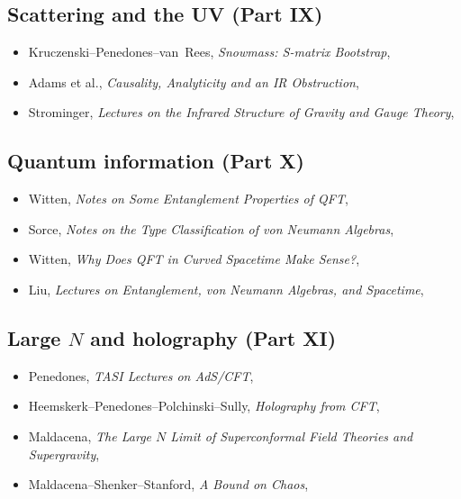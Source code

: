\subsection*{Scattering and the UV (Part IX)}
\begin{itemize}
\item[$\bullet$] Kruczenski--Penedones--van~Rees, \emph{Snowmass: S-matrix Bootstrap}, 
\item[$\circ$] Adams et al., \emph{Causality, Analyticity and an IR Obstruction}, 
\item[$\bullet$] Strominger, \emph{Lectures on the Infrared Structure of Gravity and Gauge Theory}, 
\end{itemize}

\subsection*{Quantum information (Part X)}
\begin{itemize}
\item[$\bullet$] Witten, \emph{Notes on Some Entanglement Properties of QFT}, 
\item[$\bullet$] Sorce, \emph{Notes on the Type Classification of von Neumann Algebras}, 
\item[$\circ$] Witten, \emph{Why Does QFT in Curved Spacetime Make Sense?}, 
\item[$\bullet$] Liu, \emph{Lectures on Entanglement, von Neumann Algebras, and Spacetime}, 
\end{itemize}

\subsection*{Large $N$ and holography (Part XI)}
\begin{itemize}
\item[$\bullet$] Penedones, \emph{TASI Lectures on AdS/CFT}, 
\item[$\circ$] Heemskerk--Penedones--Polchinski--Sully, \emph{Holography from CFT}, 
\item[$\circ$] Maldacena, \emph{The Large $N$ Limit of Superconformal Field Theories and Supergravity}, 
\item[$\circ$] Maldacena--Shenker--Stanford, \emph{A Bound on Chaos}, 
\end{itemize}


